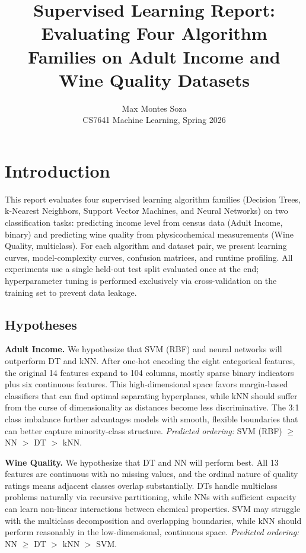 \documentclass[10pt,twocolumn]{article}
\title{\textbf{Supervised Learning Report: Evaluating Four Algorithm Families on Adult Income and Wine Quality Datasets}}
\author{Max Montes Soza \\ CS7641 Machine Learning, Spring 2026}
\date{}
\begin{document}
\maketitle

\section{Introduction}

This report evaluates four supervised learning algorithm families (Decision Trees, k-Nearest Neighbors, Support Vector Machines, and Neural Networks) on two classification tasks: predicting income level from census data (Adult Income, binary) and predicting wine quality from physicochemical measurements (Wine Quality, multiclass). For each algorithm and dataset pair, we present learning curves, model-complexity curves, confusion matrices, and runtime profiling. All experiments use a single held-out test split evaluated once at the end; hyperparameter tuning is performed exclusively via cross-validation on the training set to prevent data leakage.

\subsection{Hypotheses}

\textbf{Adult Income.} We hypothesize that SVM (RBF) and neural networks will outperform DT and kNN. After one-hot encoding the eight categorical features, the original 14 features expand to 104 columns, mostly sparse binary indicators plus six continuous features. This high-dimensional space favors margin-based classifiers that can find optimal separating hyperplanes, while kNN should suffer from the curse of dimensionality as distances become less discriminative. The 3:1 class imbalance further advantages models with smooth, flexible boundaries that can better capture minority-class structure. \textit{Predicted ordering:} SVM (RBF) $\geq$ NN $>$ DT $>$ kNN.

\textbf{Wine Quality.} We hypothesize that DT and NN will perform best. All 13 features are continuous with no missing values, and the ordinal nature of quality ratings means adjacent classes overlap substantially. DTs handle multiclass problems naturally via recursive partitioning, while NNs with sufficient capacity can learn non-linear interactions between chemical properties. SVM may struggle with the multiclass decomposition and overlapping boundaries, while kNN should perform reasonably in the low-dimensional, continuous space. \textit{Predicted ordering:} NN $\geq$ DT $>$ kNN $>$ SVM.
\end{document}
